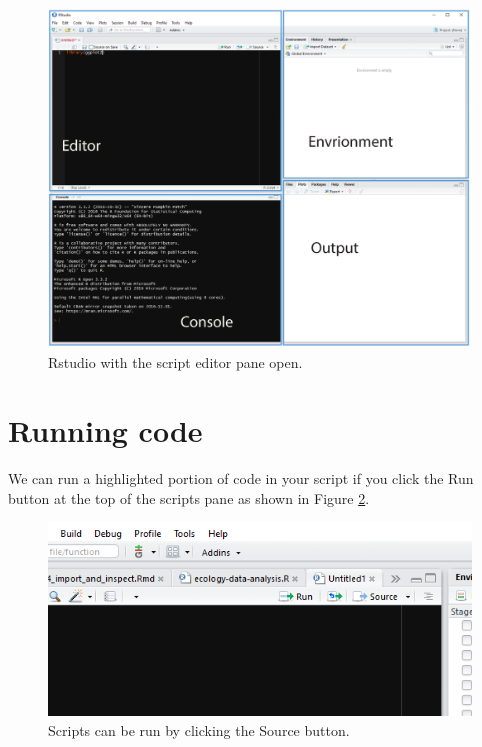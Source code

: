 \documentclass[12pt,]{book}
\begin{document}
\begin{figure}

{\centering \includegraphics[width=0.8\linewidth]{img/rstudio_screenshot_four_panes} 

}

\caption{Rstudio with the script editor pane open.}\label{fig:script-pane}
\end{figure}

\hypertarget{running-code}{%
\section{Running code}\label{running-code}}

We can run a highlighted portion of code in your script if you click the Run
button at the top of the scripts pane as shown in Figure \ref{fig:run-script}.



\begin{figure}

{\centering \includegraphics[width=0.8\linewidth]{img/run_script} 

}

\caption{Scripts can be run by clicking the Source button.}\label{fig:run-script}
\end{figure}
\end{document}
